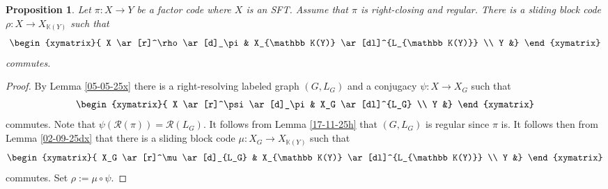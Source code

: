 \documentclass[12pt,oneside,english]{amsart}
\newtheorem{prop}[thm]{Proposition}
\begin{document}
\begin{prop}\label{18-11-25a} Let $\pi : X \to Y$ be a factor code where $X$ is an SFT. Assume that $\pi$ is right-closing and regular. There is a sliding block code $\rho : X \to X_{\mathbb K(Y)}$ such that 
\begin{equation*}
\begin{xymatrix}{
 X \ar[r]^\rho \ar[d]_\pi  & X_{\mathbb K(Y)} \ar[dl]^{L_{\mathbb K(Y)}} \\
  Y &}
\end{xymatrix}
\end{equation*}
commutes.
\end{prop}
\begin{proof} By Lemma \ref{05-05-25x} there is a right-resolving labeled graph $(G,L_G)$ and a conjugacy $\psi : X \to X_G$ such that
\begin{equation*}
\begin{xymatrix}{
 X \ar[r]^\psi \ar[d]_\pi & X_G \ar[dl]^{L_G} \\
  Y &}
\end{xymatrix}
\end{equation*}
commutes. Note that $\psi(\mathcal R(\pi)) = \mathcal R(L_G)$. It follows from Lemma \ref{17-11-25h} that $(G,L_G)$ is regular since $\pi$ is. It follows then from Lemma \ref{02-09-25dx} that there is a sliding block code $\mu : X_G \to X_{\mathbb K(Y)}$ such that
\begin{equation*}
\begin{xymatrix}{
 X_G \ar[r]^\mu \ar[d]_{L_G}  & X_{\mathbb K(Y)} \ar[dl]^{L_{\mathbb K(Y)}} \\
  Y &}
\end{xymatrix}
\end{equation*}
commutes. Set $\rho := \mu \circ \psi$.
\end{proof}

\end{document}
